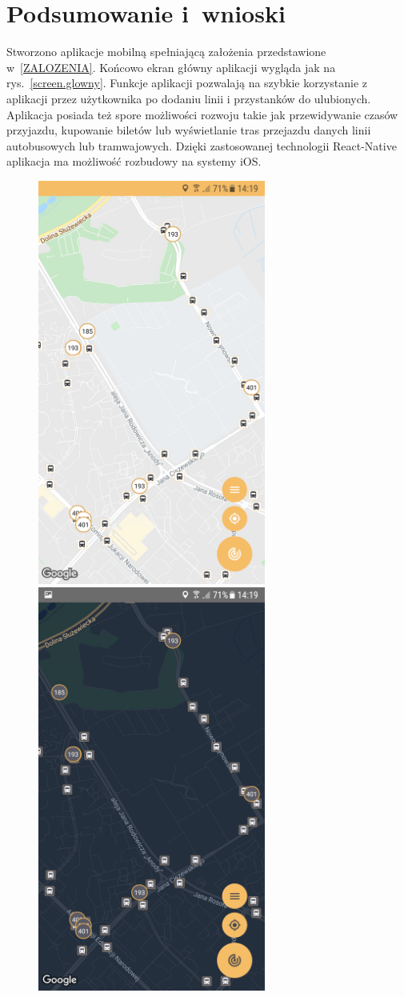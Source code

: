 \documentclass{SGGW-thesis}
\begin{document}
\chapter{Podsumowanie i~wnioski}
Stworzono aplikacje mobilną spełniającą założenia przedstawione w~\ref{ZALOZENIA}.
Końcowo ekran główny aplikacji wygląda jak na rys.~\ref{screen.glowny}.
Funkcje aplikacji pozwalają na szybkie korzystanie z aplikacji przez użytkownika po dodaniu linii i przystanków do ulubionych.
Aplikacja posiada też spore możliwości rozwoju takie jak przewidywanie czasów przyjazdu, kupowanie biletów lub wyświetlanie tras przejazdu danych linii autobusowych lub tramwajowych.
Dzięki zastosowanej technologii React-Native aplikacja ma możliwość rozbudowy na systemy iOS.
\begin{figure}
  \centering
  \includegraphics[width=75mm]{screeny/glowny_jasny}
  \enspace
  \includegraphics[width=75mm]{screeny/glowny_ciemny}

\end{figure}
\end{document}
